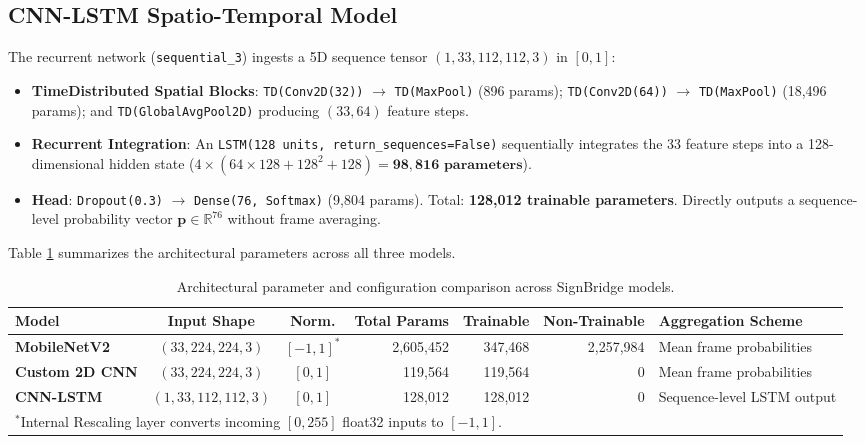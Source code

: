 \subsection{CNN-LSTM Spatio-Temporal Model}
The recurrent network (\texttt{sequential\_3}) ingests a 5D sequence tensor $(1, 33, 112, 112, 3)$ in $[0, 1]$:
\begin{itemize}
    \item \textbf{TimeDistributed Spatial Blocks}: \texttt{TD(Conv2D(32))} $\to$ \texttt{TD(MaxPool)} (896 params); \texttt{TD(Conv2D(64))} $\to$ \texttt{TD(MaxPool)} (18,496 params); and \texttt{TD(GlobalAvgPool2D)} producing $(33, 64)$ feature steps.
    \item \textbf{Recurrent Integration}: An \texttt{LSTM(128 units, return\_sequences=False)} sequentially integrates the 33 feature steps into a 128-dimensional hidden state ($4 \times (64\times128 + 128^2 + 128) = \mathbf{98,816\text{ parameters}}$).
    \item \textbf{Head}: \texttt{Dropout(0.3)} $\to$ \texttt{Dense(76, Softmax)} (9,804 params). Total: \textbf{128,012 trainable parameters}. Directly outputs a sequence-level probability vector $\mathbf{p} \in \mathbb{R}^{76}$ without frame averaging.
\end{itemize}

Table \ref{tab:model_specs_unified} summarizes the architectural parameters across all three models.

\begin{table}[htbp]
\centering
\caption{Architectural parameter and configuration comparison across SignBridge models.}
\label{tab:model_specs_unified}
\scriptsize
\begin{tabularx}{\textwidth}{l c c r r r X}
\toprule
\textbf{Model} & \textbf{Input Shape} & \textbf{Norm.} & \textbf{Total Params} & \textbf{Trainable} & \textbf{Non-Trainable} & \textbf{Aggregation Scheme} \\
\midrule
\textbf{MobileNetV2} & $(33, 224, 224, 3)$ & $[-1, 1]^*$ & 2,605,452 & 347,468 & 2,257,984 & Mean frame probabilities \\
\textbf{Custom 2D CNN} & $(33, 224, 224, 3)$ & $[0, 1]$ & 119,564 & 119,564 & 0 & Mean frame probabilities \\
\textbf{CNN-LSTM} & $(1, 33, 112, 112, 3)$ & $[0, 1]$ & 128,012 & 128,012 & 0 & Sequence-level LSTM output \\
\bottomrule
\multicolumn{7}{l}{\tiny $^*$Internal Rescaling layer converts incoming $[0, 255]$ float32 inputs to $[-1, 1]$.}
\end{tabularx}
\end{table}

